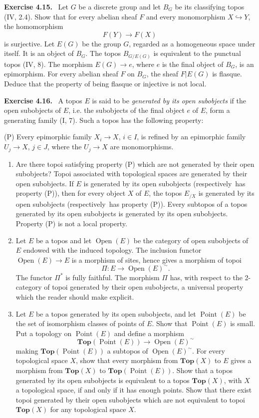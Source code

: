\documentclass[11pt]{article}
\newcommand{\resp}{respectively}
\newcommand{\Top}{\mathbf{Top}}
\newcommand{\Ouv}{\operatorname{Open}}
\newcommand{\Point}{\operatorname{Point}}
\newenvironment{remarktext}[1]{\par\medskip\noindent\textbf{#1.}\ }{\par\medskip}
\begin{document}
\begin{remarktext}{Exercise 4.15}
Let $G$ be a discrete group and let $B_G$ be its classifying topos (IV, 2.4). Show that for every abelian sheaf $F$ and every monomorphism $X\hookrightarrow Y$, the homomorphism
\[
F(Y)\longrightarrow F(X)
\]
is surjective. Let $E(G)$ be the group $G$, regarded as a homogeneous space under itself. It is an object of $B_G$. The topos $B_{G/E(G)}$ is equivalent to the punctual topos (IV, 8). The morphism $E(G)\to e$, where $e$ is the final object of $B_G$, is an epimorphism. For every abelian sheaf $F$ on $B_G$, the sheaf $F|E(G)$ is flasque. Deduce that the property of being flasque or injective is not local.
\end{remarktext}

\begin{remarktext}{Exercise 4.16}
A topos $E$ is said to be \emph{generated by its open subobjects} if the open subobjects of $E$, i.e. the subobjects of the final object $e$ of $E$, form a generating family (I, 7). Such a topos has the following property:

\smallskip
\noindent(P) Every epimorphic family $X_i\to X$, $i\in I$, is refined by an epimorphic family $U_j\to X$, $j\in J$, where the $U_j\to X$ are monomorphisms.

\begin{enumerate}[label=\alph*)]
\item Are there topoi satisfying property (P) which are not generated by their open subobjects? Topoi associated with topological spaces are generated by their open subobjects. If $E$ is generated by its open subobjects (\resp\ has property (P)), then for every object $X$ of $E$, the topos $E_{/X}$ is generated by its open subobjects (\resp\ has property (P)). Every subtopos of a topos generated by its open subobjects is generated by its open subobjects. Property (P) is not a local property.

\item Let $E$ be a topos and let $\Ouv(E)$ be the category of open subobjects of $E$ endowed with the induced topology. The inclusion functor $\Ouv(E)\to E$ is a morphism of sites, hence gives a morphism of topoi
\[
\Pi:E\longrightarrow \Ouv(E)^\sim .
\]
The functor $\Pi^*$ is fully faithful. The morphism $\Pi$ has, with respect to the 2-category of topoi generated by their open subobjects, a universal property which the reader should make explicit.

\item Let $E$ be a topos generated by its open subobjects, and let $\Point(E)$ be the set of isomorphism classes of points of $E$. Show that $\Point(E)$ is small. Put a topology on $\Point(E)$ and define a morphism
\[
\Top(\Point(E))\longrightarrow \Ouv(E)^\sim
\]
making $\Top(\Point(E))$ a subtopos of $\Ouv(E)^\sim$. For every topological space $X$, show that every morphism from $\Top(X)$ to $E$ gives a morphism from $\Top(X)$ to $\Top(\Point(E))$. Show that a topos generated by its open subobjects is equivalent to a topos $\Top(X)$, with $X$ a topological space, if and only if it has enough points. Show that there exist topoi generated by their open subobjects which are not equivalent to topoi $\Top(X)$ for any topological space $X$.


\end{enumerate}
\end{remarktext}
\end{document}
